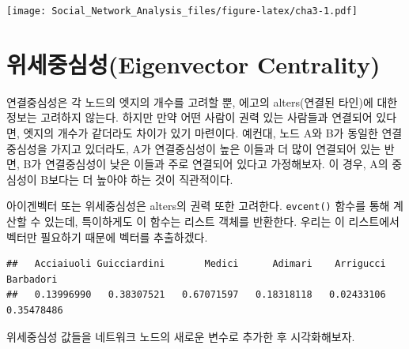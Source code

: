 \documentclass[
]{book}
\newenvironment{Shaded}{\begin{snugshade}}{\end{snugshade}}
\newcommand{\AttributeTok}[1]{\textcolor[rgb]{0.77,0.63,0.00}{#1}}
\newcommand{\DecValTok}[1]{\textcolor[rgb]{0.00,0.00,0.81}{#1}}
\newcommand{\FunctionTok}[1]{\textcolor[rgb]{0.00,0.00,0.00}{#1}}
\newcommand{\NormalTok}[1]{#1}
\newcommand{\OtherTok}[1]{\textcolor[rgb]{0.56,0.35,0.01}{#1}}
\newcommand{\SpecialCharTok}[1]{\textcolor[rgb]{0.00,0.00,0.00}{#1}}
\newcommand{\StringTok}[1]{\textcolor[rgb]{0.31,0.60,0.02}{#1}}
\begin{document}
\texttt{[image: Social\_Network\_Analysis\_files/figure-latex/cha3-1.pdf]}

\hypertarget{uxc704uxc138uxc911uxc2ecuxc131eigenvector-centrality}{%
\section{위세중심성(Eigenvector Centrality)}\label{uxc704uxc138uxc911uxc2ecuxc131eigenvector-centrality}}

연결중심성은 각 노드의 엣지의 개수를 고려할 뿐, 에고의 alters(연결된 타인)에 대한 정보는 고려하지 않는다. 하지만 만약 어떤 사람이 권력 있는 사람들과 연결되어 있다면, 엣지의 개수가 같더라도 차이가 있기 마련이다. 예컨대, 노드 A와 B가 동일한 연결중심성을 가지고 있더라도, A가 연결중심성이 높은 이들과 더 많이 연결되어 있는 반면, B가 연결중심성이 낮은 이들과 주로 연결되어 있다고 가정해보자. 이 경우, A의 중심성이 B보다는 더 높아야 하는 것이 직관적이다.

아이겐벡터 또는 위세중심성은 alters의 권력 또한 고려한다. \texttt{evcent()} 함수를 통해 계산할 수 있는데, 특이하게도 이 함수는 리스트 객체를 반환한다. 우리는 이 리스트에서 벡터만 필요하기 때문에 벡터를 추출하겠다.

\begin{Shaded}
\end{Shaded}

\begin{verbatim}
##   Acciaiuoli Guicciardini       Medici      Adimari    Arrigucci    Barbadori 
##   0.13996990   0.38307521   0.67071597   0.18318118   0.02433106   0.35478486
\end{verbatim}

위세중심성 값들을 네트워크 노드의 새로운 변수로 추가한 후 시각화해보자.

\begin{Shaded}
\end{Shaded}
\end{document}
